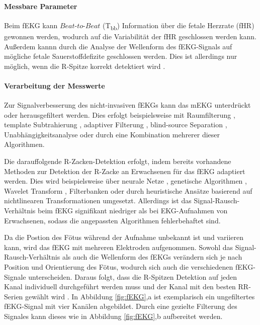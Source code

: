 \documentclass[10pt,a4paper,headinclude,twoside, plainheadsepline, open=right, numbers=noenddot, twocolumn]{article}
\begin{document}
\paragraph{Messbare Parameter}
Beim fEKG kann $Beat$-$to$-$Beat$ (T\textsubscript{bb}) Information über die fetale Herzrate (fHR) gewonnen werden, wodurch auf die Variabilität der fHR geschlossen werden kann.
Außerdem kannn durch die Analyse der Wellenform des fEKG-Signals auf mögliche fetale Sauerstoffdefizite geschlossen werden.
Dies ist allerdings nur möglich, wenn die R-Spitze korrekt detektiert wird \cite{warmerdam2018hierarchical}.

\paragraph{Verarbeitung der Messwerte}
Zur Signalverbesserung des nicht-invasiven fEKGs kann das mEKG unterdrückt oder herausgefiltert werden.
Dies erfolgt beispielsweise mit Raumfilterung \cite{bergveld1981new}, template Subtrahierung \cite{cerutti1986variability, vullings2009dynamic,  ungureanu2007fetal}, adaptiver Filterung \cite{sameni2008extraction, widrow1975adaptive, strobach1994event}, blind-source Separation \cite{andreotti2014robust, de2000fetal, kanjilal1997fetal}, Unabhängigkeitsanalyse \cite{taylor2003non} oder durch eine Kombination mehrerer dieser Algorithmen\cite{lipponen2014principal,  behar2014combining, varanini2014efficient}.

Die darauffolgende R-Zacken-Detektion erfolgt, indem bereits vorhandene Methoden zur Detektion der R-Zacke an Erwachsenen für das fEKG adaptiert werden.
Dies wird beispielsweise über neurale Netze \cite{hu1993applications, vijaya1998ann, xue1992neural}, genetische Algorithmen \cite{poli1995genetic}, Wavelet Transform \cite{li1995detection, kadambe1999wavelet, martinez2000evaluation, romero2009low, legarreta2005continuous}, Filterbanken \cite{afonso1999ecg} oder durch heuristische Ansätze basierend auf nichtlinearen Transformationen\cite{kohler2003qrs, suppappola1994nonlinear, trahanias1993approach} umgesetzt.
Allerdings ist das Signal-Rausch-Verhältnis beim fEKG signifikant niedriger als bei EKG-Aufnahmen von Erwachsenen, sodass die angepassten Algorithmen fehlerbehaftet sind. 

Da die Postion des Fötus während der Aufnahme unbekannt ist und variieren kann, wird das fEKG mit mehreren Elektroden aufgenommen.
Sowohl das Signal-Rausch-Verhältnis als auch die Wellenform des fEKGs verändern sich je nach Position und Orientierung des Fötus, wodurch sich auch die verschiedenen fEKG-Signale unterscheiden.
Daraus folgt, dass die R-Spitzen Detektion auf jeden Kanal individuell durchgeführt werden muss und der Kanal mit den besten RR-Serien gewählt wird \cite{warmerdam2018hierarchical}.
In Abbildung \ref{fig:fEKG},a ist exemplarisch ein ungefiltertes fEKG-Signal mit vier Kanälen abgebildet. Durch eine gezielte Filterung des Signales kann dieses wie in Abbildung \ref{fig:fEKG},b aufbereitet werden. 
\newline
\newline
\newline
\newline
\end{document}
